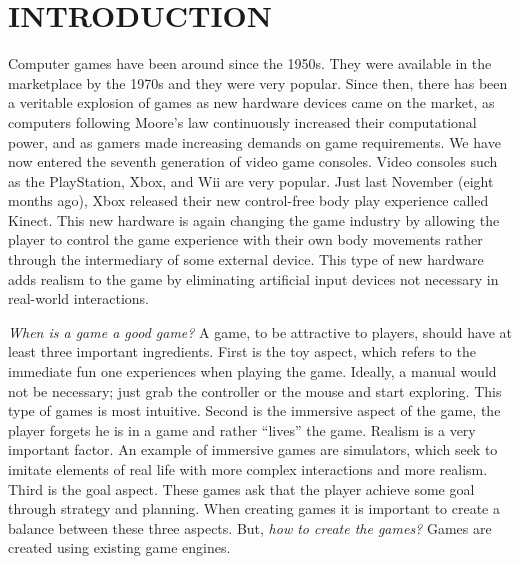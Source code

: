 \chapter{INTRODUCTION}\label{chap1}








Computer games have been around since the 1950s\cite{historyVideoGames}. They were available in the marketplace by the 1970s and they were very popular. Since then, there has been a veritable explosion of games as new hardware devices came on the market, as computers following Moore's law continuously increased their computational power, and as gamers made increasing demands on game requirements. We have now entered the seventh generation of video game consoles\cite{usingVideoGames}. Video consoles such as the PlayStation, Xbox, and Wii are very popular. Just last November (eight months ago), Xbox released their new control-free body play experience called Kinect\cite{kinect}. This new hardware is again changing the game industry by allowing the player to control the game experience with their own body movements rather through the intermediary of some external device. This type of new hardware adds realism to the game by eliminating artificial input devices not necessary in real-world interactions.

\textit{When is a game a good game?} A game, to be attractive to players, should have at least three important ingredients\cite{bookGameKit2}. First is the toy aspect, which refers to the immediate fun one experiences when playing the game. Ideally, a manual would not be necessary;  just grab the controller or the mouse and start exploring. This type of games is most intuitive. Second is the immersive aspect of the game, the player forgets he is in a game and rather ``lives'' the game. Realism is a very important factor. An example of immersive games are simulators, which seek to imitate elements of real life with more complex interactions and more realism. Third is the goal aspect. These games ask that the player achieve some goal through strategy and planning. When creating games it is important to create a balance between these three aspects. But, \textit{how to create the games?} Games are created using existing game engines.

